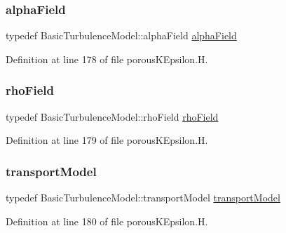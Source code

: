 \subsubsection{\texorpdfstring{alpha\+Field}{alphaField}}
{\footnotesize\ttfamily typedef Basic\+Turbulence\+Model\+::alpha\+Field \hyperlink{classFoam_1_1RASModels_1_1porousKEpsilon_a06a66094f33d6817d19225445c5ea874}{alpha\+Field}}



Definition at line 178 of file porous\+K\+Epsilon.\+H.

\mbox{\label{classFoam_1_1RASModels_1_1porousKEpsilon_a1dda906cfc9022335f0782a632302cd8}} 
\subsubsection{\texorpdfstring{rho\+Field}{rhoField}}
{\footnotesize\ttfamily typedef Basic\+Turbulence\+Model\+::rho\+Field \hyperlink{classFoam_1_1RASModels_1_1porousKEpsilon_a1dda906cfc9022335f0782a632302cd8}{rho\+Field}}



Definition at line 179 of file porous\+K\+Epsilon.\+H.

\mbox{\label{classFoam_1_1RASModels_1_1porousKEpsilon_ac0a5dc3c45a2d1c61a649bc435a1a48a}} 
\subsubsection{\texorpdfstring{transport\+Model}{transportModel}}
{\footnotesize\ttfamily typedef Basic\+Turbulence\+Model\+::transport\+Model \hyperlink{classFoam_1_1RASModels_1_1porousKEpsilon_ac0a5dc3c45a2d1c61a649bc435a1a48a}{transport\+Model}}



Definition at line 180 of file porous\+K\+Epsilon.\+H.



